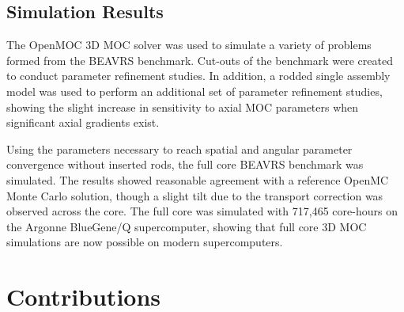 \subsection{Simulation Results}
\label{sec:sub:sim-results}

The OpenMOC 3D \ac{MOC} solver was used to simulate a variety of problems formed from the BEAVRS benchmark. Cut-outs of the benchmark were created to conduct parameter refinement studies. In addition, a rodded single assembly model was used to perform an additional set of parameter refinement studies, showing the slight increase in sensitivity to axial \ac{MOC} parameters when significant axial gradients exist.

Using the parameters necessary to reach spatial and angular parameter convergence without inserted rods, the full core BEAVRS benchmark was simulated. The results showed reasonable agreement with a reference OpenMC Monte Carlo solution, though a slight tilt due to the transport correction was observed across the core. The full core was simulated with 717,465 core-hours on the Argonne BlueGene/Q supercomputer, showing that full core 3D \ac{MOC} simulations are now possible on modern supercomputers.

\clearpage
\section{Contributions}
\label{sec:contributions}

